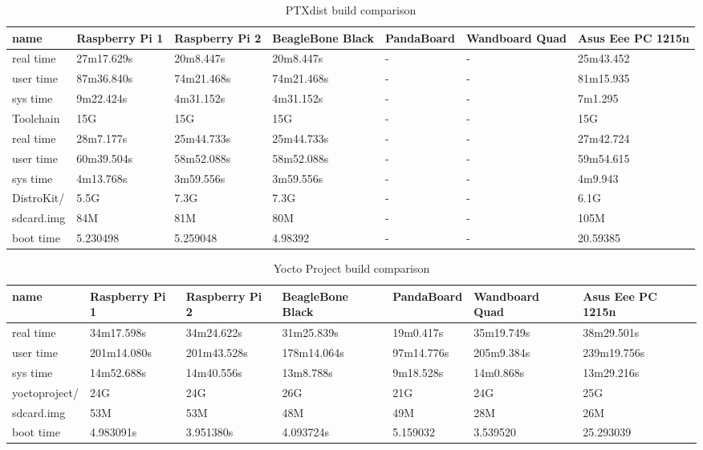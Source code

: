 \documentclass[printmode]{mgr}
\begin{document}
\begin{table}
  \begin{tabular}{| p{2cm} | p{2cm} | p{2cm} | p{2cm} | p{2cm} | p{2cm} | p{2cm} |}
    \hline
    name & Raspberry Pi 1 & Raspberry Pi 2 & BeagleBone Black & PandaBoard & Wandboard Quad & Asus Eee PC 1215n \\
    \hline
    real time & 27m17.629s & 20m8.447s & 20m8.447s & - & - & 25m43.452 \\
    \hline
    user time & 87m36.840s & 74m21.468s & 74m21.468s & - & - & 81m15.935 \\
    \hline
    sys time & 9m22.424s & 4m31.152s & 4m31.152s & - & - & 7m1.295 \\
    \hline
    Toolchain & 15G & 15G & 15G & - & - & 15G \\
    \hline
    real time & 28m7.177s & 25m44.733s & 25m44.733s & - & - & 27m42.724 \\
    \hline
    user time & 60m39.504s & 58m52.088s & 58m52.088s & - & - & 59m54.615 \\
    \hline
    sys time & 4m13.768s & 3m59.556s & 3m59.556s & - & - & 4m9.943 \\
    \hline
    DistroKit/ & 5.5G & 7.3G & 7.3G & - & - & 6.1G \\
    \hline
    sdcard.img & 84M & 81M & 80M & - & - & 105M \\
    \hline
    boot time & 5.230498 & 5.259048 & 4.98392 & - & - & 20.59385 \\
    \hline
  \end{tabular}
  \caption{PTXdist build comparison}
\end{table}




\begin{table}
  \begin{tabular}{| p{2cm} | p{2cm} | p{2cm} | p{2cm} | p{2cm} | p{2cm} | p{2cm} |}
    \hline
    name & Raspberry Pi 1 & Raspberry Pi 2 & BeagleBone Black & PandaBoard & Wandboard Quad & Asus Eee PC 1215n \\
    \hline
    real time & 34m17.598s & 34m24.622s & 31m25.839s & 19m0.417s & 35m19.749s & 38m29.501s \\
    \hline
    user time & 201m14.080s & 201m43.528s & 178m14.064s & 97m14.776s & 205m9.384s & 239m19.756s \\
    \hline
    sys time & 14m52.688s & 14m40.556s & 13m8.788s & 9m18.528s & 14m0.868s & 13m29.216s \\
    \hline
    yoctoproject/ & 24G & 24G & 26G & 21G & 24G & 25G \\
    \hline
    sdcard.img & 53M & 53M & 48M & 49M & 28M & 26M \\
    \hline
    boot time & 4.983091s & 3.951380s & 4.093724s & 5.159032 & 3.539520 & 25.293039 \\
    \hline
  \end{tabular}
  \caption{Yocto Project build comparison}
\end{table}
\end{document}

